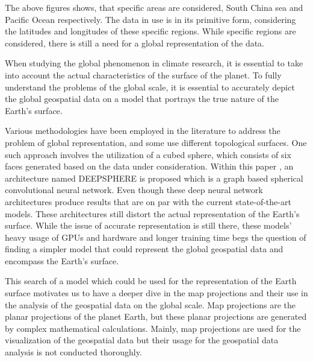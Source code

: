 The above figures shows, that specific areas are considered, South China sea and Pacific Ocean respectively. The data in use is in its primitive form, considering the latitudes and longitudes of these specific regions. While specific regions are considered, there is still a need for a global representation of the data.

When studying the global phenomenon in climate research, it is essential to take into account the actual characteristics of the surface of the planet. To fully understand the problems of the global scale, it is essential to accurately depict the global geospatial data on a model that portrays the true nature of the Earth's surface.

Various methodologies have been employed in the literature to address the problem of global representation, and some use different topological surfaces. One such approach \cite{Weyn_2020} involves the utilization of a cubed sphere, which consists of six faces generated based on the data under consideration.
Within this paper \cite{DBLP:journals/corr/abs-2012-15000}, an architecture named DEEPSPHERE is proposed which is a graph based spherical convolutional neural network.
Even though these deep neural network architectures produce results that are on par with the current state-of-the-art models. These architectures still distort the actual representation of the Earth's surface.
While the issue of accurate representation is still there, these models' heavy usage of GPUs and hardware and longer training time begs the question of finding a simpler model that could represent the global geospatial data and encompass the Earth's surface.

This search of a model which could be used for the representation of the Earth surface motivates us to have a deeper dive in the map projections and their use in the analysis of the geospatial data on the global scale. Map projections are the planar projections of the planet Earth, but these planar projections are generated by complex mathematical calculations. Mainly, map projections are used for the visualization of the geospatial data but their usage for the geospatial data analysis is not conducted thoroughly.


